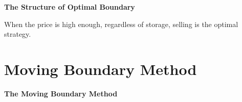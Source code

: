 \documentclass{beamer}
\begin{document}
\begin{frame}
{\bf The Structure of Optimal Boundary}

\begin{theorem}
When the price is high enough, regardless of storage, selling is the optimal strategy.
\end{theorem}


\end{frame}

\section{Moving Boundary Method}
\begin{frame}
{\bf The Moving Boundary Method}


\end{frame}
\end{document}
